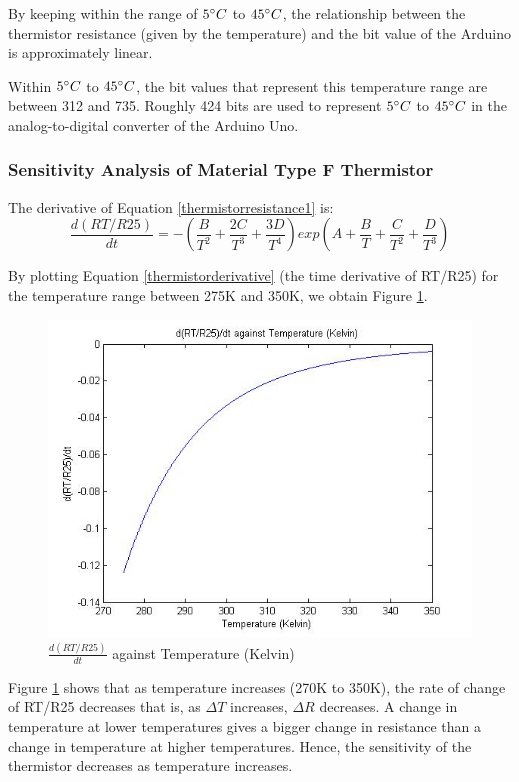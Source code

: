 By keeping within the range of $5\degree C$ to $45\degree C$, the relationship between the thermistor resistance (given by the temperature) and the bit value of the Arduino is approximately linear.

Within $5\degree C$ to $45\degree C$, the bit values that represent this temperature range are between 312 and 735. Roughly 424 bits are used to represent $5\degree C$ to $45\degree C$ in the analog-to-digital converter of the Arduino Uno. 

\subsubsection{Sensitivity Analysis of Material Type F Thermistor}

The derivative of Equation \ref{thermistorresistance1} is: 
\begin{equation}
	\frac{d(RT/R25)}{dt}=-\left (\frac{B}{T^2}+\frac{2C}{T^3}+\frac{3D}{T^4} \right ) exp(A+\frac{B}{T}+\frac{C}{T^2}+\frac{D}{T^3}) 
	\label{thermistorderivative}
\end{equation}

By plotting Equation \ref{thermistorderivative} (the time derivative of RT/R25) for the temperature range between 275K and 350K, we obtain Figure \ref{dRTR25dttemperature}. 

\begin{figure}[H]
	\centering
	\includegraphics[width=0.8\linewidth]{thermistor5.jpg}
	\caption{$\frac{d(RT/R25)}{dt}$ against Temperature (Kelvin)}
	\label{dRTR25dttemperature}
\end{figure}

Figure \ref{dRTR25dttemperature} shows that as temperature increases (270K to 350K), the rate of change of RT/R25 decreases that is, as $\Delta T$ increases, $\Delta R$ decreases.  A change in temperature at lower temperatures gives a bigger change in resistance than a change in temperature at higher temperatures. Hence, the sensitivity of the thermistor decreases as temperature increases. 

